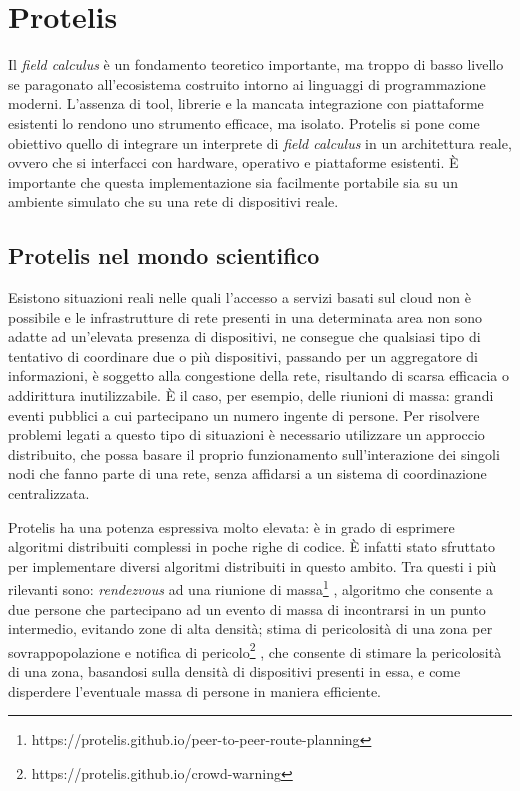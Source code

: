 \section{Protelis}
Il \textit{field calculus} è un fondamento teoretico importante, ma troppo di
basso livello se paragonato all'ecosistema costruito intorno ai linguaggi di
programmazione moderni. L'assenza di tool, librerie e la mancata integrazione
con piattaforme esistenti lo rendono uno strumento efficace, ma
isolato. Protelis si pone come obiettivo quello di integrare un interprete di
\textit{field calculus} in un architettura reale, ovvero che si interfacci con
hardware, operativo e piattaforme esistenti. È importante che questa
implementazione sia facilmente portabile sia su un ambiente simulato che su una
rete di dispositivi reale.

\subsection{Protelis nel mondo scientifico}
Esistono situazioni reali nelle quali l'accesso a servizi basati sul cloud non è
possibile e le infrastrutture di rete presenti in una determinata area non sono
adatte ad un'elevata presenza di dispositivi, ne consegue che qualsiasi tipo di
tentativo di coordinare due o più dispositivi, passando per un aggregatore di
informazioni, è soggetto alla congestione della rete, risultando di scarsa
efficacia o addirittura inutilizzabile. È il caso, per esempio, delle riunioni
di massa: grandi eventi pubblici a cui partecipano un numero ingente di persone.
Per risolvere problemi legati a questo tipo di situazioni è necessario
utilizzare un approccio distribuito, che possa basare il proprio funzionamento
sull'interazione dei singoli nodi che fanno parte di una rete, senza affidarsi a
un sistema di coordinazione centralizzata.

Protelis ha una potenza espressiva molto elevata: è in grado di esprimere
algoritmi distribuiti complessi in poche righe di codice. È infatti stato
sfruttato per implementare diversi algoritmi distribuiti in questo ambito. Tra
questi i più rilevanti sono: \textit{rendezvous} ad una riunione di
massa\footnote{https://protelis.github.io/peer-to-peer-route-planning}
\cite{Protelis}, algoritmo che consente a due persone che partecipano ad un
evento di massa di incontrarsi in un punto intermedio, evitando zone di alta
densità; stima di pericolosità di una zona per sovrappopolazione e notifica di
pericolo\footnote{https://protelis.github.io/crowd-warning} \cite{7056345}, che
consente di stimare la pericolosità di una zona, basandosi sulla densità di
dispositivi presenti in essa, e come disperdere l'eventuale massa di persone in
maniera efficiente.

